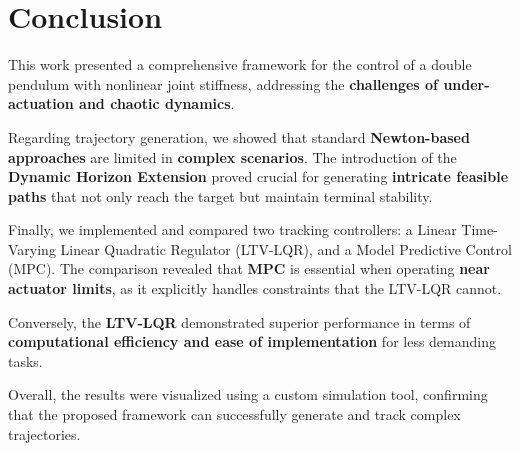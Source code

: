 
\section{Conclusion}

This work presented a comprehensive framework for the control of a double pendulum with nonlinear joint stiffness, addressing the \textbf{challenges of under-actuation and chaotic dynamics}.

Regarding trajectory generation, we showed that standard \textbf{Newton-based approaches} are limited in \textbf{complex scenarios}. The introduction of the \textbf{Dynamic Horizon Extension} proved crucial for generating \textbf{intricate feasible paths} that not only reach the target but maintain terminal stability.

Finally, we implemented and compared two tracking controllers: a Linear Time-Varying Linear Quadratic Regulator (LTV-LQR), and a Model Predictive Control (MPC). The comparison revealed that \textbf{MPC} is essential when operating \textbf{near actuator limits}, as it explicitly handles constraints that the LTV-LQR cannot.

Conversely, the \textbf{LTV-LQR} demonstrated superior performance in terms of \textbf{computational efficiency and ease of implementation} for less demanding tasks.

Overall, the results were visualized using a custom simulation tool, confirming that the proposed framework can successfully generate and track complex trajectories.

\newpage